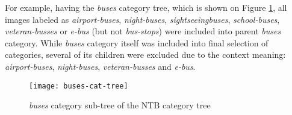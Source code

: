     For example, having the \textit{buses} category tree, which is shown on Figure \ref{fig:buses-cat-tree}, all images labeled as \textit{airport-buses}, \textit{night-buses}, \textit{sightseeingbuses}, \textit{school-buses}, \textit{veteran-busses} or \textit{e-bus} (but not \textit{bus-stops}) were included into parent \textit{buses} category. While \textit{buses} category itself was included into final selection of categories, several of its children were excluded due to the context meaning: \textit{airport-buses}, \textit{night-buses}, \textit{veteran-busses} and \textit{e-bus}.
    
    \begin{figure}[h!]
        \centering
        \texttt{[image: buses-cat-tree]}
        \caption{\textit{buses} category sub-tree of the NTB category tree}
        \label{fig:buses-cat-tree}
    \end{figure}
    
    
    
    
    
    
    
